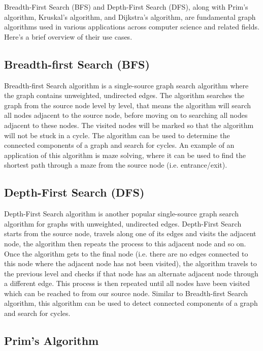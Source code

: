 Breadth-First Search (BFS) and Depth-First Search (DFS), along with Prim's algorithm, Kruskal's algorithm, and Dijkstra's algorithm, are fundamental graph algorithms used in various applications across computer science and related fields. Here's a brief overview of their use cases.

\subsection{Breadth-first Search (BFS)}

Breadth-first Search algorithm is a single-source graph search algorithm where the graph contains unweighted, undirected edges. The algorithm searches the graph from the source node level by level, that means the algorithm will search all nodes adjacent to the source node, before moving on to searching all nodes adjacent to these nodes. The visited nodes will be marked so that the algorithm will not be stuck in a cycle. The algorithm can be used to determine the connected components of a graph and search for cycles. An example of an application of this algorithm is maze solving, where it can be used to find the shortest path through a maze from the source node (i.e. entrance/exit).

\subsection{Depth-First Search (DFS)}

Depth-First Search algorithm is another popular single-source graph search algorithm for graphs with unweighted, undirected edges. Depth-First Search starts from the source node, travels along one of its edges and visits the adjacent node, the algorithm then repeats the process to this adjacent node and so on. Once the algorithm gets to the final node (i.e. there are no edges connected to this node where the adjacent node has not been visited), the algorithm travels to the previous level and checks if that node has an alternate adjacent node through a different edge. This process is then repeated until all nodes have been visited which can be reached to from our source node. Similar to  Breadth-first Search algorithm, this algorithm can be used to detect connected components of a graph and search for cycles.

\subsection{Prim's Algorithm}


